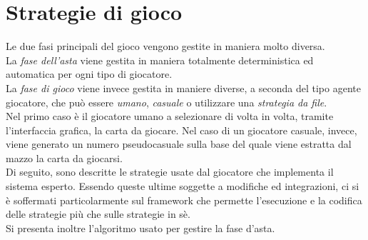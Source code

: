 \chapter*{Strategie di gioco}
\graphicspath{{Chapter4/Chapter4Figs/PNG/}{Chapter4/Chapter4Figs/PDF/}{Chapter4/Chapter4Figs/}}

Le due fasi principali del gioco vengono gestite in maniera molto diversa.\\
La \emph{fase dell'asta} viene gestita in maniera totalmente deterministica ed automatica per ogni tipo di giocatore.\\
La \emph{fase di gioco} viene invece gestita in maniere diverse, a seconda del tipo agente giocatore, che può essere \emph{umano}, \emph{casuale} o utilizzare una \emph{strategia da file}.\\
Nel primo caso è il giocatore umano a selezionare di volta in volta, tramite l'interfaccia grafica, la carta da giocare.
Nel caso di un giocatore casuale, invece, viene generato un numero pseudocasuale sulla base del quale viene estratta dal mazzo la carta da giocarsi.\\
Di seguito, sono descritte le strategie usate dal giocatore che implementa il sistema esperto.
Essendo queste ultime soggette a modifiche ed integrazioni, ci si è soffermati particolarmente sul framework che permette l'esecuzione e la codifica delle strategie più che sulle strategie in sè.\\
Si presenta inoltre l'algoritmo usato per gestire la fase d'asta.


